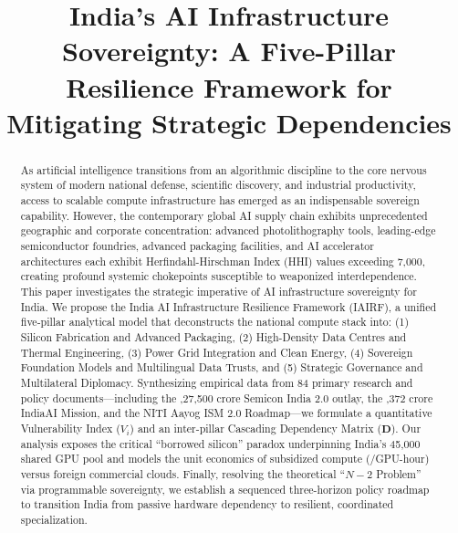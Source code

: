 \documentclass[conference,a4paper]{IEEEtran}
\begin{document}
\title{India's AI Infrastructure Sovereignty: A Five-Pillar Resilience Framework for Mitigating Strategic Dependencies}

\author{
}

\maketitle

\begin{abstract}
As artificial intelligence transitions from an algorithmic discipline to the core nervous system of modern national defense, scientific discovery, and industrial productivity, access to scalable compute infrastructure has emerged as an indispensable sovereign capability. However, the contemporary global AI supply chain exhibits unprecedented geographic and corporate concentration: advanced photolithography tools, leading-edge semiconductor foundries, advanced packaging facilities, and AI accelerator architectures each exhibit Herfindahl-Hirschman Index (HHI) values exceeding 7,000, creating profound systemic chokepoints susceptible to weaponized interdependence. This paper investigates the strategic imperative of AI infrastructure sovereignty for India. We propose the India AI Infrastructure Resilience Framework (IAIRF), a unified five-pillar analytical model that deconstructs the national compute stack into: (1) Silicon Fabrication and Advanced Packaging, (2) High-Density Data Centres and Thermal Engineering, (3) Power Grid Integration and Clean Energy, (4) Sovereign Foundation Models and Multilingual Data Trusts, and (5) Strategic Governance and Multilateral Diplomacy. Synthesizing empirical data from 84 primary research and policy documents—including the ,27,500 crore Semicon India 2.0 outlay, the ,372 crore IndiaAI Mission, and the NITI Aayog ISM 2.0 Roadmap—we formulate a quantitative Vulnerability Index ($V_i$) and an inter-pillar Cascading Dependency Matrix ($\mathbf{D}$). Our analysis exposes the critical ``borrowed silicon'' paradox underpinning India's 45,000 shared GPU pool and models the unit economics of subsidized compute (/GPU-hour) versus foreign commercial clouds. Finally, resolving the theoretical ``$N-2$ Problem'' via programmable sovereignty, we establish a sequenced three-horizon policy roadmap to transition India from passive hardware dependency to resilient, coordinated specialization.
\end{abstract}
\end{document}
